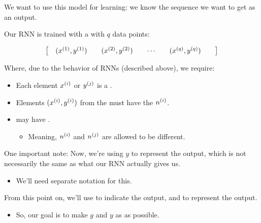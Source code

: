         We want to use this model for  learning: we know the sequence we want to get as an output.\\

        \begin{definition}
            Our RNN is trained with a  with $q$ data points:

            \begin{equation*}
                \begin{bmatrix}
                    \quad (x^{(1)}, y^{(1)}) && (x^{(2)}, y^{(2)}) && \cdots && (x^{(q)}, y^{(q)}) \quad \quad
                \end{bmatrix}
            \end{equation*}

            Where, due to the behavior of RNNs (described above), we require:

            \begin{itemize}
                \item Each element $x^{(i)}$ or $y^{(j)}$ is a .
                
                \item Elements $(x^{(i)}, y^{(i)})$ from the  must have the  $n^{(i)}$.

                \item {} may have . 
                    \begin{itemize}
                        \item Meaning, $n^{(i)}$ and $n^{(j)}$ are allowed to be different.
                    \end{itemize}
            \end{itemize}
        \end{definition}


        One important note: Now, we're using $y$ to represent the  output, which is not necessarily the same as what our RNN actually gives us.

        \begin{itemize}
            \item We'll need separate notation for this.\\
        \end{itemize}

        \begin{notation}
            From this point on, we'll use  to indicate the  output, and  to represent the  output.

            \begin{itemize}
                \item So, our goal is to make $g$ and $y$ as  as possible.
            \end{itemize}
        \end{notation}

